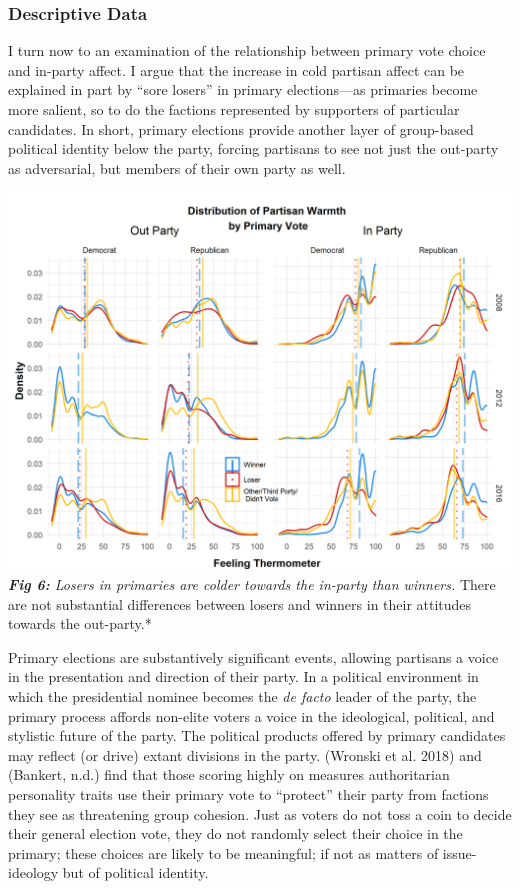 \documentclass[
  12,
]{paper}
\begin{document}
\hypertarget{descriptive-data}{%
\subsubsection{Descriptive Data}\label{descriptive-data}}

I turn now to an examination of the relationship between primary vote
choice and in-party affect. I argue that the increase in cold partisan
affect can be explained in part by ``sore losers'' in primary
elections---as primaries become more salient, so to do the factions
represented by supporters of particular candidates. In short, primary
elections provide another layer of group-based political identity below
the party, forcing partisans to see not just the out-party as
adversarial, but members of their own party as well.

\includegraphics{fig/gg-primaries-grid.png} \emph{\textbf{Fig 6:} Losers
in primaries are colder towards the in-party than winners.} There are
not substantial differences between losers and winners in their
attitudes towards the out-party.*

Primary elections are substantively significant events, allowing
partisans a voice in the presentation and direction of their party. In a
political environment in which the presidential nominee becomes the
\emph{de facto} leader of the party, the primary process affords
non-elite voters a voice in the ideological, political, and stylistic
future of the party. The political products offered by primary
candidates may reflect (or drive) extant divisions in the party.
(Wronski et al. 2018) and (Bankert, n.d.) find that those scoring highly
on measures authoritarian personality traits use their primary vote to
``protect'' their party from factions they see as threatening group
cohesion. Just as voters do not toss a coin to decide their general
election vote, they do not randomly select their choice in the primary;
these choices are likely to be meaningful; if not as matters of
issue-ideology but of political identity.
\end{document}
